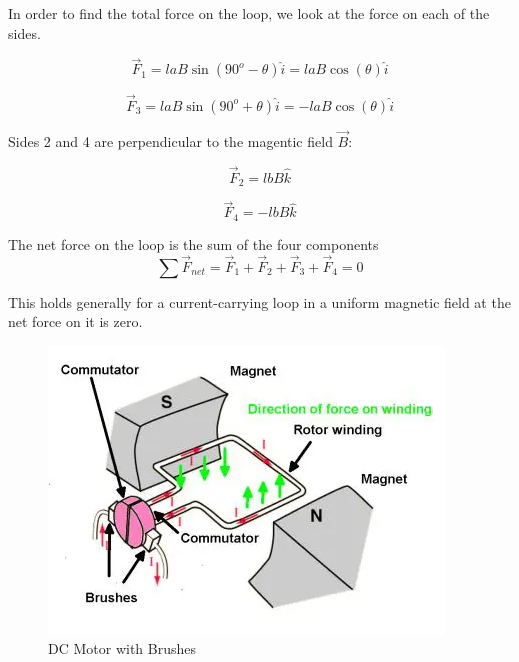 \documentclass[14pt]{memoir}
\begin{document}
In order to find the total force on the loop, we look at the force on each of the sides.

\begin{equation}
\vec{F}_1 = l a B \sin(90^o - \theta) \hat{i} = l a B \cos(\theta) \hat{i}
\end{equation}

\begin{equation}
\vec{F}_3 = l a B \sin(90^o + \theta) \hat{i} = -l a B \cos(\theta) \hat{i}
\end{equation}

Sides 2 and 4 are perpendicular to the magentic field $\vec{B}$:

\begin{equation}
\vec{F}_2 = l b B \hat{k}
\end{equation}

\begin{equation}
\vec{F}_4 = -l b B \hat{k}
\end{equation}


The net force on the loop is the sum of the four components
\begin{equation}
\sum \vec{F}_{net} = \vec{F}_1 + \vec{F}_2 + \vec{F}_3 + \vec{F}_4 = 0
\end{equation}

This holds generally for a current-carrying loop in a uniform magnetic field at the net force on it is zero.

\begin{figure}[H]
\begin{center}
\includegraphics[scale=0.7]{fig/dcmotor.png}
\caption{DC Motor with Brushes}
\label{fig:magdip}
\end{center}
\end{figure}
\end{document}
